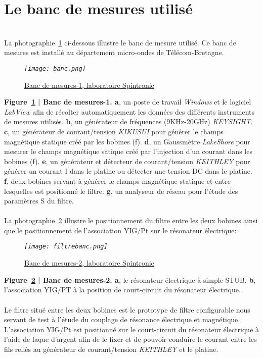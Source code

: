 \documentclass[12pt,fleqn]{book} %
\begin{document}
\section{Le banc de mesures utilisé}
~\\\indent La photographie~\underline{\color{blue}\ref{banc}} ci-dessous illustre le banc de mesure utilisé. Ce banc de mesures est installé au département micro-ondes de Télécom-Bretagne.
\begin{figure}[H]
	\centering
	\itshape
	\texttt{[image: banc.png]}
	\caption{\label{banc} \underline{Banc de mesures-1, laboratoire Spintronic}}
\end{figure}
\noindent\footnotesize  \textbf{Figure~\underline{\color{blue}\ref{banc}} | Banc de mesures-1. a}, un poste de travail \emph{Windows} et le logiciel \emph{LabView} afin de récolter automatiquement les données des différents instruments de mesures utilisés. \textbf{b}, un générateur de fréquences (9KHz-20GHz) \emph{KEYSIGHT}. \textbf{c}, un générateur de courant/tension \emph{KIKUSUI} pour générer le champs magnétique statique créé par les bobines (f). \textbf{d}, un Gaussmètre \emph{LakeShore} pour mesurer le champs magnétique satique créé par l'injection d'un courant dans les bobines (f). \textbf{e}, un générateur et détecteur de courant/tension \emph{KEITHLEY} pour générer un courant I dans le platine ou détecter une tension DC dans le platine. \textbf{f}, deux bobines servant à générer le champs magnétique statique et entre lesquelles est positionné le filtre. \textbf{g}, un analyseur de réseau pour l'étude des paramètres S du filtre.  
~\\\\
\normalsize La photographie~\underline{\color{blue}\ref{filtrebanc}} illustre le positionnement du filtre entre les deux bobines ainsi que le positionnement de l'association YIG/Pt sur le résonateur électrique:
\begin{figure}[H]
	\centering
	\itshape
	\texttt{[image: filtrebanc.png]}
	\caption{\label{filtrebanc} \underline{Banc de mesures-2, laboratoire Spintronic}}
\end{figure}
\noindent\footnotesize  \textbf{Figure~\underline{\color{blue}\ref{filtrebanc}} | Banc de mesures-2. a}, le résonateur électrique à simple STUB. \textbf{b}, l'association YIG/PT à la position de court-circuit du résonateur électrique.
~\\\\
\normalsize Le filtre situé entre les deux bobines est le prototype de filtre configurable nous servant de test à l'étude du couplage de résonance électrique et magnétique. L'association YIG/Pt est positionné sur le court-circuit du résonateur électrique à l'aide de laque d'argent afin de le fixer et de pouvoir conduire le courant entre les fils reliés au générateur de courant/tension \emph{KEITHLEY} et le platine.
\end{document}
